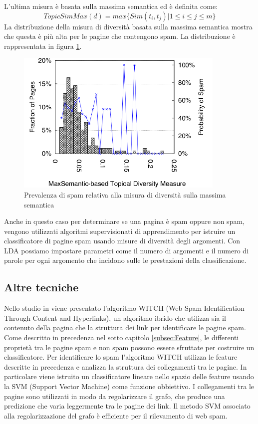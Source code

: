L'ultima misura è basata sulla massima semantica ed è definita come:
\begin{equation}
TopicSimMax(d)= max\{Sim(t_i,t_j)|1 \leq i \leq j \leq m \}
\end{equation}
La distribuzione della misura di diversità basata sulla massima semantica mostra che questa è più alta per le pagine che contengono spam. La distribuzione è rappresentata in figura \ref{fig:zhou4}.
\begin{figure}	
\centering
\includegraphics[width=10cm]{immagini/zhou/immagine4}
\caption{Prevalenza di spam relativa alla misura di diversità sulla massima semantica}
\label{fig:zhou4}
\end{figure}

Anche in questo caso per determinare se una pagina è spam oppure non spam, vengono utilizzati algoritmi supervisionati di apprendimento per istruire un classificatore di pagine spam usando misure di diversità degli argomenti. Con LDA possiamo impostare parametri come il numero di argomenti e il numero di parole per ogni argomento che incidono sulle le prestazioni della classificazione.

\subsection{Altre tecniche}
Nello studio in \cite{Abernethy:2008:WSI:1451983.1451994} viene presentato  l'algoritmo WITCH (Web Spam Identification Through Content and Hyperlinks), un algoritmo ibrido che utilizza sia il contenuto della pagina che la struttura dei link per identificare le pagine spam. Come descritto in precedenza nel sotto capitolo \ref{subsec:Feature}, le differenti proprietà tra le pagine spam e non spam possono essere sfruttate per costruire un classificatore. Per identificare lo spam l'algoritmo WITCH  utilizza le feature descritte in precedenza e analizza la struttura dei collegamenti tra le pagine. In particolare viene istruito un classificatore lineare nello spazio delle feature usando la SVM (Support Vector Machine) come funzione obbiettivo. I collegamenti tra le pagine sono utilizzati in modo da regolarizzare il grafo, che produce una predizione che varia leggermente tra le pagine dei link. Il metodo SVM associato alla regolarizzazione del grafo è efficiente per il rilevamento di web spam. 

